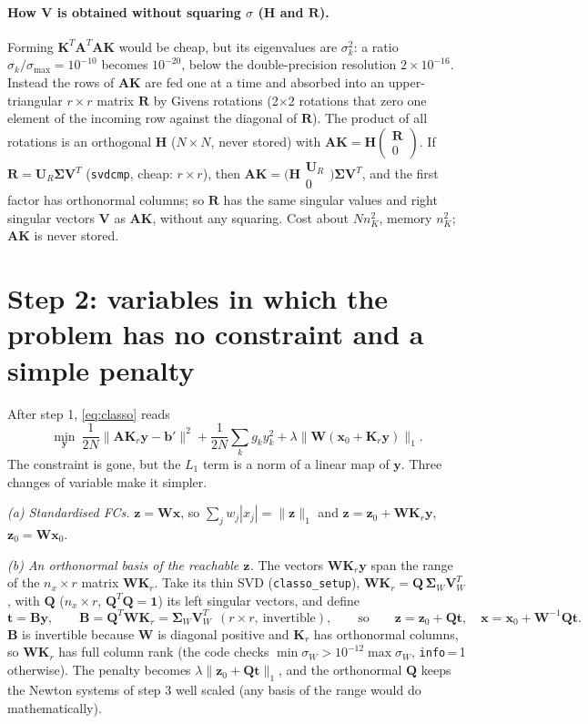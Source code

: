 \documentclass[11pt,a4paper]{article}
\newcommand{\bA}{\mathbf A}
\newcommand{\bB}{\mathbf B}
\newcommand{\bH}{\mathbf H}
\newcommand{\bK}{\mathbf K}
\newcommand{\bQ}{\mathbf Q}
\newcommand{\bR}{\mathbf R}
\newcommand{\bU}{\mathbf U}
\newcommand{\bV}{\mathbf V}
\newcommand{\bW}{\mathbf W}
\newcommand{\bb}{\mathbf b}
\newcommand{\bt}{\mathbf t}
\newcommand{\bx}{\mathbf x}
\newcommand{\by}{\mathbf y}
\newcommand{\bz}{\mathbf z}
\newcommand{\bSig}{\boldsymbol\Sigma}
\newcommand{\code}[1]{\texttt{#1}}
\begin{document}
\paragraph{How $\bV$ is obtained without squaring $\sigma$ ($\bH$ and $\bR$).} Forming $\bK^T\bA^T\bA\bK$ would be cheap, but its
eigenvalues are $\sigma_k^2$: a ratio $\sigma_k/\sigma_{\max}=10^{-10}$ becomes $10^{-20}$, below the double-precision
resolution $2\times10^{-16}$. Instead the rows of $\bA\bK$ are fed one at a time and absorbed into an
upper-triangular $r\times r$ matrix $\bR$ by Givens rotations (2$\times$2 rotations that zero one
element of the incoming row against the diagonal of $\bR$). The product of all rotations is an
orthogonal $\bH$ ($N\times N$, never stored) with
$\bA\bK=\bH\begin{pmatrix}\bR\\0\end{pmatrix}$. If $\bR=\bU_R\bSig\bV^T$ (\code{svdcmp}, cheap: $r\times r$), then
$\bA\bK=\big(\bH\begin{smallmatrix}\bU_R\\0\end{smallmatrix}\big)\bSig\bV^T$, and the first factor has orthonormal columns;
so $\bR$ has the same singular values and right singular vectors $\bV$ as $\bA\bK$, without any squaring.
Cost about $Nn_K^2$, memory $n_K^2$; $\bA\bK$ is never stored.

\section{Step 2: variables in which the problem has no constraint and a simple penalty}\label{sec:step2}
After step 1, \eqref{eq:classo} reads
\begin{equation}\label{eq:iny}
\min_{\by}\ \frac1{2N}\|\bA\bK_r\by-\bb'\|^2+\frac1{2N}\sum_kg_ky_k^2+\lambda\|\bW(\bx_0+\bK_r\by)\|_1 .
\end{equation}
The constraint is gone, but the $L_1$ term is a norm of a linear map of $\by$. Three changes of variable make it simpler.

\emph{(a) Standardised FCs.} $\bz=\bW\bx$, so $\sum_jw_j|x_j|=\|\bz\|_1$ and
$\bz=\bz_0+\bW\bK_r\by$, $\bz_0=\bW\bx_0$.

\emph{(b) An orthonormal basis of the reachable $\bz$.} The vectors $\bW\bK_r\by$ span the range of the
$n_x\times r$ matrix $\bW\bK_r$. Take its thin SVD (\code{classo\_setup}),
$\bW\bK_r=\bQ\,\bSig_W\bV_W^T$, with $\bQ$ ($n_x\times r$, $\bQ^T\bQ=\mathbf 1$) its left singular vectors, and define
\begin{equation}\label{eq:t}
\bt=\bB\by,\qquad \bB=\bQ^T\bW\bK_r=\bSig_W\bV_W^T\ \ (r\times r,\ \text{invertible}),\qquad\text{so}\qquad
\bz=\bz_0+\bQ\bt,\quad \bx=\bx_0+\bW^{-1}\bQ\bt .
\end{equation}
$\bB$ is invertible because $\bW$ is diagonal positive and $\bK_r$ has orthonormal columns, so $\bW\bK_r$ has
full column rank (the code checks $\min\sigma_W>10^{-12}\max\sigma_W$, \code{info}\,=\,1 otherwise). The penalty
becomes $\lambda\|\bz_0+\bQ\bt\|_1$, and the orthonormal $\bQ$ keeps the Newton systems of step 3 well scaled
(any basis of the range would do mathematically).
\end{document}
